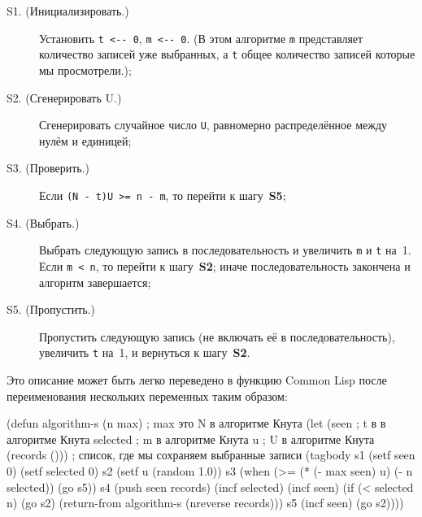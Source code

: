 \begin{description}
\item[S1. (Инициализировать.)] Установить \lstinline!t <-- 0!, \lstinline!m <-- 0!. (В
  этом алгоритме \lstinline!m! представляет количество записей уже выбранных, а \lstinline!t! общее
  количество записей которые мы просмотрели.);

\item[S2. (Сгенерировать U.)]  Сгенерировать случайное число \lstinline!U!, равномерно
  распределённое между нулём и единицей;

\item[S3. (Проверить.)] Если \lstinline!(N - t)U >= n - m!, то перейти к шагу~\textbf{S5};

\item[S4. (Выбрать.)] Выбрать следующую запись в последовательность и увеличить
\lstinline!m! и \lstinline!t! на~1. Если \lstinline!m < n!, то перейти к шагу~\textbf{S2}; иначе 
последовательность закончена и алгоритм завершается;

\item[S5. (Пропустить.)] Пропустить следующую запись (не включать её в 
последовательность), увеличить \lstinline!t! на~1, и вернуться к шагу~\textbf{S2}.

\end{description}

Это описание может быть легко переведено в  функцию Common Lisp после переименования
нескольких переменных таким образом:

\begin{myverb}
(defun algorithm-s (n max) ; max это N в алгоритме Кнута
  (let (seen               ; t в в алгоритме Кнута
        selected           ; m в алгоритме Кнута
        u                  ; U в алгоритме Кнута
        (records ()))      ; список, где мы сохраняем выбранные записи
    (tagbody
     s1
       (setf seen 0)
       (setf selected 0)
     s2
       (setf u (random 1.0))
     s3
       (when (>= (* (- max seen) u) (- n selected)) (go s5))
     s4
       (push seen records)
       (incf selected)
       (incf seen)
       (if (< selected n)
           (go s2)
           (return-from algorithm-s (nreverse records)))
     s5
       (incf seen)
       (go s2))))
\end{myverb}

